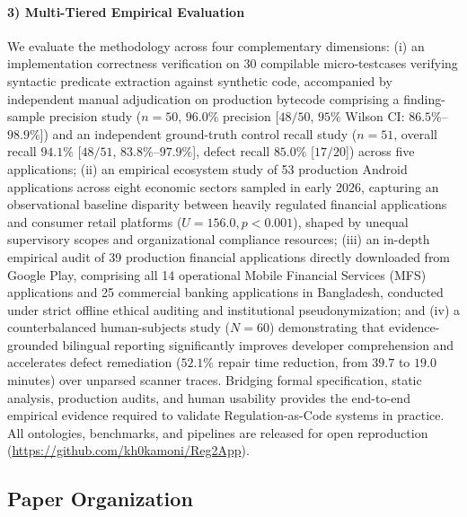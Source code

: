 \paragraph{3) Multi-Tiered Empirical Evaluation} We evaluate the methodology across four complementary dimensions: (i) an implementation correctness verification on 30 compilable micro-testcases verifying syntactic predicate extraction against synthetic code, accompanied by independent manual adjudication on production bytecode comprising a finding-sample precision study ($n=50$, $96.0\%$ precision [$48/50$, $95\%$ Wilson CI: $86.5\%$--$98.9\%$]) and an independent ground-truth control recall study ($n=51$, overall recall $94.1\%$ [$48/51$, $83.8\%$--$97.9\%$], defect recall $85.0\%$ [$17/20$]) across five applications; (ii) an empirical ecosystem study of 53 production Android applications across eight economic sectors sampled in early 2026, capturing an observational baseline disparity between heavily regulated financial applications and consumer retail platforms ($U = 156.0, p < 0.001$), shaped by unequal supervisory scopes and organizational compliance resources; (iii) an in-depth empirical audit of 39 production financial applications directly downloaded from Google Play, comprising all 14 operational Mobile Financial Services (MFS) applications and 25 commercial banking applications in Bangladesh, conducted under strict offline ethical auditing and institutional pseudonymization; and (iv) a counterbalanced human-subjects study ($N=60$) demonstrating that evidence-grounded bilingual reporting significantly improves developer comprehension and accelerates defect remediation ($52.1\%$ repair time reduction, from $39.7$ to $19.0$ minutes) over unparsed scanner traces. Bridging formal specification, static analysis, production audits, and human usability provides the end-to-end empirical evidence required to validate Regulation-as-Code systems in practice. All ontologies, benchmarks, and pipelines are released for open reproduction (\url{https://github.com/kh0kamoni/Reg2App}).

\subsection{Paper Organization}
\label{sec:intro:org}

